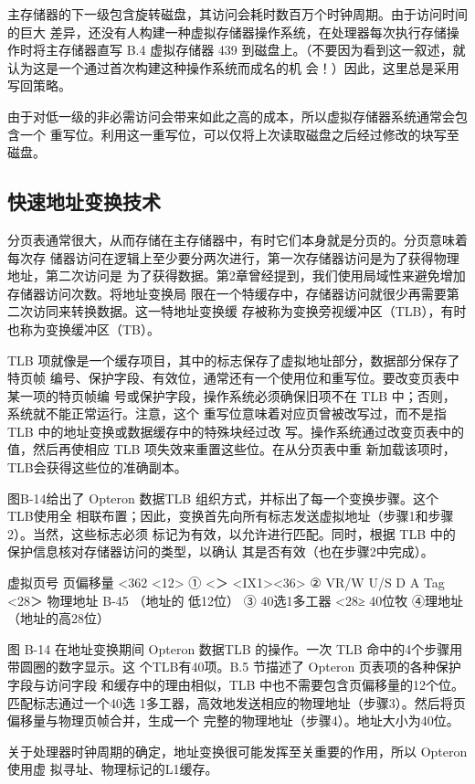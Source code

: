 主存储器的下一级包含旋转磁盘，其访问会耗时数百万个时钟周期。由于访问时间的巨大
差异，还没有人构建一种虚拟存储器操作系统，在处理器每次执行存储操作时将主存储器直写
B.4 虚拟存储器
439
到磁盘上。（不要因为看到这一叙述，就认为这是一个通过首次构建这种操作系统而成名的机
会！）因此，这里总是采用写回策略。

由于对低一级的非必需访问会带来如此之高的成本，所以虚拟存储器系统通常会包含一个
重写位。利用这一重写位，可以仅将上次读取磁盘之后经过修改的块写至磁盘。

\subsection{快速地址变换技术}

分页表通常很大，从而存储在主存储器中，有时它们本身就是分页的。分页意味着每次存
储器访问在逻辑上至少要分两次进行，第一次存储器访问是为了获得物理地址，第二次访问是
为了获得数据。第2章曾经提到，我们使用局域性来避免增加存储器访问次数。将地址变换局
限在一个特缓存中，存储器访问就很少再需要第二次访同来转换数据。这一特地址变换缓
存被称为变换旁视缓冲区（TLB），有时也称为变换缓冲区（TB）。

TLB 项就像是一个缓存项目，其中的标志保存了虚拟地址部分，数据部分保存了特页帧
编号、保护字段、有效位，通常还有一个使用位和重写位。要改变页表中某一项的特页帧编
号或保护字段，操作系统必须确保旧项不在 TLB 中；否则，系统就不能正常运行。注意，这个
重写位意味着对应页曾被改写过，而不是指 TLB 中的地址变换或数据缓存中的特殊块经过改
写。操作系统通过改变页表中的值，然后再使相应 TLB 项失效来重置这些位。在从分页表中重
新加载该项时，TLB会获得这些位的准确副本。

图B-14给出了 Opteron 数据TLB 组织方式，并标出了每一个变换步骤。这个 TLB使用全
相联布置；因此，变换首先向所有标志发送虚拟地址（步骤1和步骤2）。当然，这些标志必须
标记为有效，以允许进行匹配。同时，根据 TLB 中的保护信息核对存储器访问的类型，以确认
其是否有效（也在步骤2中完成）。

虚拟页号 页偏移量
<362
<12>
①
<＞
<IX1><36>
②
VR/W
U/S D A
Tag
<28＞
物理地址
B-45
（地址的
低12位）
③
40选1多工器
<28≥
40位牧
④理地址
（地址的高28位）

图 B-14 在地址变换期间 Opteron 数据TLB 的操作。一次 TLB 命中的4个步骤用带圆圈的数字显示。这
个TLB有40项。B.5 节描述了 Opteron 页表项的各种保护字段与访问字段
和缓存中的理由相似，TLB 中也不需要包含页偏移量的12个位。匹配标志通过一个40选
1多工器，高效地发送相应的物理地址（步骤3）。然后将页偏移量与物理页帧合并，生成一个
完整的物理地址（步骤4）。地址大小为40位。

关于处理器时钟周期的确定，地址变换很可能发挥至关重要的作用，所以 Opteron 使用虚
拟寻址、物理标记的L1缓存。

